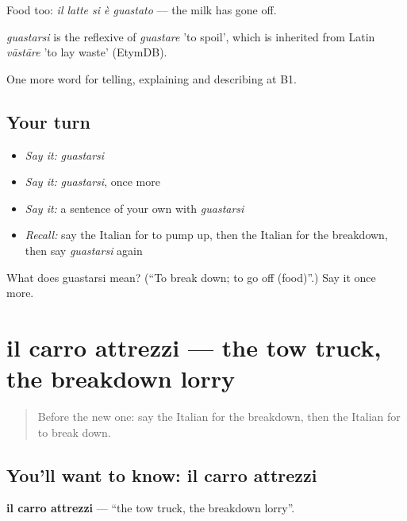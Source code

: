Food too: \emph{il latte si è guastato} — the milk has gone off.

\begin{cousinweb}
\emph{guastarsi} is the reflexive of \emph{guastare} 'to spoil', which is inherited from Latin \emph{vāstāre} 'to lay waste' (EtymDB).
\end{cousinweb}

\begin{grammarlens}[title={What you've built}]
One more word for telling, explaining and describing at B1.
\end{grammarlens}

\subsection*{Your turn}
\begin{itemize}
\raggedright
  \item \emph{Say it:} \emph{guastarsi}
  \item \emph{Say it:} \emph{guastarsi}, once more
  \item \emph{Say it:} a sentence of your own with \emph{guastarsi}
  \item \emph{Recall:} say the Italian for to pump up, then the Italian for the breakdown, then say \emph{guastarsi} again
\end{itemize}

\begin{tcolorbox}[breakable,colback=teal!4,colframe=teal!35!black,title={Before you move on}]
What does guastarsi mean? (\textquotedblleft{}To break down; to go off (food)\textquotedblright{}.) Say it once more.
\end{tcolorbox}
\section[il carro attrezzi]{il carro attrezzi — the tow truck, the breakdown lorry}

\label{lesson:IT-C410-carro-attrezzi}



\begin{quote}
Before the new one: say the Italian for the breakdown, then the Italian for to break down.
\end{quote}

\subsection*{You'll want to know: il carro attrezzi}
\textbf{il carro attrezzi} — \textquotedblleft{}the tow truck, the breakdown lorry\textquotedblright{}.


